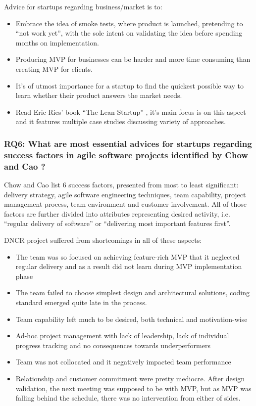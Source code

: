 \documentclass{article}
\begin{document}
Advice for startups regarding business/market is to:
\begin{itemize}
\item Embrace the idea of smoke tests, where product is launched, pretending to ``not work yet'', with the sole intent on validating the idea before spending months on implementation.
\item Producing MVP for businesses can be harder and more time consuming than creating MVP for clients.
\item It's of utmost importance for a startup to find the quickest possible way to learn whether their product answers the market needs.
\item Read Eric Ries' book ``The Lean Startup'' \cite{ries2011lean}, it's main focus is on this aspect and it features multiple case studies discussing variety of approaches.
\end{itemize}

\subsubsection{RQ6: What are most essential advices for startups regarding success factors in agile software projects identified by Chow and Cao \cite{cao2008agile}?}
Chow and Cao list 6 success factors, presented from most to least significant: delivery strategy, agile software engineering techniques, team capability, project management process, team environment and customer involvement. All of those factors are further divided into attributes representing desired activity, i.e. ``regular delivery of software'' or ``delivering most important features first''.

DNCR project suffered from shortcomings in all of these aspects:
\begin{itemize}
\item The team was so focused on achieving feature-rich MVP that it neglected regular delivery and as a result did not learn during MVP implementation phase
\item The team failed to choose simplest design and architectural solutions, coding standard emerged quite late in the process.
\item Team capability left much to be desired, both technical and motivation-wise
\item Ad-hoc project management with lack of leadership, lack of individual progress tracking and no consequences towards underperformers
\item Team was not collocated and it negatively impacted team performance
\item Relationship and customer commitment were pretty mediocre. After design validation, the next meeting was supposed to be with MVP, but as MVP was falling behind the schedule, there was no intervention from either of sides.
\end{itemize}
\end{document}

